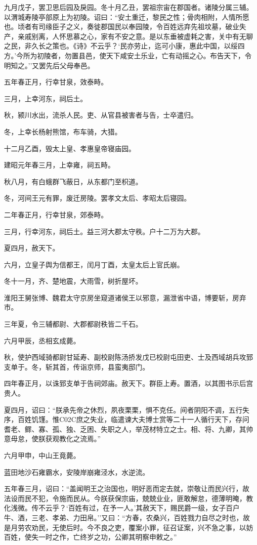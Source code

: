 \documentclass[]{article}
\begin{document}
九月戊子，罢卫思后园及戾园。冬十月乙丑，罢祖宗宙在郡国者。诸陵分属三辅。以渭城寿陵亭部原上为初陵。诏曰：``安土重迁，黎民之性；骨肉相附，人情所愿也。顷者有司缘臣子之义，奏徙郡国民以奉园陵，令百姓远弃先祖坟墓，破业失产，亲戚别离，人怀思慕之心，家有不安之意。是以东垂被虚耗之害，关中有无聊之民，非久长之策也。《诗》不云乎？`民亦劳止，迄可小康，惠此中国，以绥四方。'今所为初陵者，勿置县邑，使天下咸安土乐业，亡有动摇之心。布告天下，令明知之。''又罢先后父母奉邑。

五年春正月，行幸甘泉，效泰畤。

三月，上幸河东，祠后土。

秋，颍川水出，流杀人民。吏、从官县被害者与告，士卒遣归。

冬，上幸长杨射熊馆，布车骑，大猎。

十二月乙酉，毁太上皇、孝惠皇帝寝庙园。

建昭元年春三月，上幸雍，祠五畤。

秋八月，有白蛾群飞蔽日，从东都门至枳道。

冬，河间王元有罪，废迁房陵。罢孝文太后、孝昭太后寝园。

二年春正月，行幸甘泉，郊泰畤。

三月，行幸河东，祠后土。益三河大郡太守秩。户十二万为大郡。

夏四月，赦天下。

六月，立皇子舆为信都王，闰月丁酉，太皇太后上官氏崩。

冬十一月，齐、楚地震，大雨雪，树折屋坏。

淮阳王舅张博、魏君太守京房坐窥道诸侯王以邪意，漏泄省中语，博要斩，房弃市。

三年夏，令三辅都尉、大郡都尉秩皆二千石。

六月甲辰，丞相玄成薨。

秋，使护西域骑都尉甘延寿、副校尉陈汤挢发戊已校尉屯田吏、士及西域胡兵攻郅支单于。冬，斩其首，传诣京师，县蛮夷邸门。

四年春正月，以诛郅支单于告祠郊庙。赦天下。群臣上寿。置酒，以其图书示后宫贵人。

夏四月，诏曰：``朕承先帝之休烈，夙夜栗栗，惧不克任。间者阴阳不调，五行失序，百姓饥馑。惟C02C庶之失业，临遣谏大夫博士赏等二十一人循行天下，存问耆老、鳏、寡、孤、独、乏困、失职之人，举茂材特立之士。相、将、九卿，其帅意毋怠，使朕获观教化之流焉。''

六月甲申，中山王竟薨。

蓝田地沙石雍霸水，安陵岸崩雍泾水，水逆流。

五年春三月，诏曰：``盖闻明王之治国也，明好恶而定去就，崇敬让而民兴行，故法设而民不犯，令施而民从。今朕获保宗庙，兢兢业业，匪敢解怠，德薄明晻，教化浅微。传不云乎？`百姓有过，在予一人。'其赦天下，赐民爵一级，女子百户牛、酒，三老、孝弟、力田帛。''又曰：``方春，农桑兴，百姓戮力自尽之时也，故是月劳农劝民，无使后时。今不良之吏，覆案小罪，征召证案，兴不急之事，以妨百姓，使失一时之作，亡终岁之功，公卿其明察申敕之。''
\end{document}
